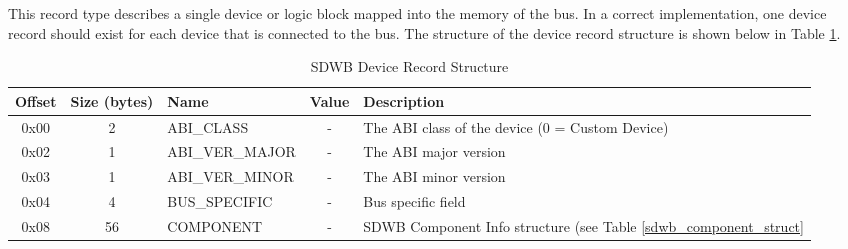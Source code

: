 \documentclass[a4paper, 12pt]{article}
\begin{document}
This record type describes a single device or logic block mapped into the memory of the
bus. In a correct implementation, one device record should exist for each device that is
connected to the bus. The structure of the device record structure is shown below in Table
\ref{sdwb_dev_struct}.

\begin{center}
  \begin{savenotes}
    \begin{table}[!ht]\footnotesize
      \caption{SDWB Device Record Structure}\label{sdwb_dev_struct}\centering
        \begin{tabular}{| c | c | l | c | p{5cm} |} \hline
        Offset & Size (bytes) & Name & Value & Description \\ \hline
        0x00 & 2 & ABI\_CLASS & - & The ABI class of the device (0 = Custom Device) \\ \hline
        0x02 & 1 & ABI\_VER\_MAJOR & - & The ABI major version \\ \hline
        0x03 & 1 & ABI\_VER\_MINOR & - & The ABI minor version \\ \hline
        0x04 & 4 & BUS\_SPECIFIC & - & Bus specific field \\ \hline
        0x08 & 56 & COMPONENT & - & SDWB Component Info structure (see Table \ref{sdwb_component_struct} \\ \hline
        \end{tabular}
    \end{table}
  \end{savenotes}
\end{center}
\end{document}
